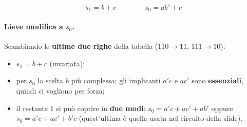 \documentclass[12pt, a4paper]{article}
\begin{document}
\[ s_1 = b + c \qquad\qquad s_0 = ab' + c \]

\paragraph{Lieve modifica a $s_0$.} Scambiando le \textbf{ultime due righe} della tabella ($110 \to 11$, $111 \to 10$):
\begin{itemize}
    \item $s_1 = b + c$ (invariata);
    \item per $s_0$ la scelta è più complessa: gli implicanti $a'c$ e $ac'$ sono \textbf{essenziali}, quindi ci vogliono per forza;
    \item il restante 1 si può coprire in \textbf{due modi}: $s_0 = a'c + ac' + ab'$ oppure $s_0 = a'c + ac' + b'c$ (quest'ultima è quella usata nel circuito della slide).
\end{itemize}
\end{document}
